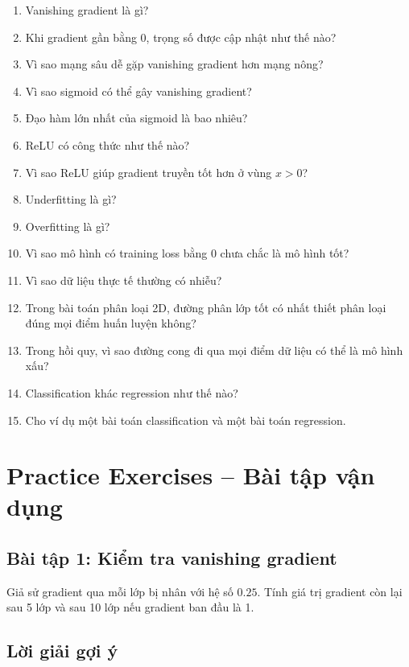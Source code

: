 \begin{enumerate}
    \item Vanishing gradient là gì?
    \item Khi gradient gần bằng 0, trọng số được cập nhật như thế nào?
    \item Vì sao mạng sâu dễ gặp vanishing gradient hơn mạng nông?
    \item Vì sao sigmoid có thể gây vanishing gradient?
    \item Đạo hàm lớn nhất của sigmoid là bao nhiêu?
    \item ReLU có công thức như thế nào?
    \item Vì sao ReLU giúp gradient truyền tốt hơn ở vùng $x>0$?
    \item Underfitting là gì?
    \item Overfitting là gì?
    \item Vì sao mô hình có training loss bằng 0 chưa chắc là mô hình tốt?
    \item Vì sao dữ liệu thực tế thường có nhiễu?
    \item Trong bài toán phân loại 2D, đường phân lớp tốt có nhất thiết phân loại đúng mọi điểm huấn luyện không?
    \item Trong hồi quy, vì sao đường cong đi qua mọi điểm dữ liệu có thể là mô hình xấu?
    \item Classification khác regression như thế nào?
    \item Cho ví dụ một bài toán classification và một bài toán regression.
\end{enumerate}

\section{Practice Exercises -- Bài tập vận dụng}

\subsection*{Bài tập 1: Kiểm tra vanishing gradient}

Giả sử gradient qua mỗi lớp bị nhân với hệ số $0.25$. Tính giá trị gradient còn lại sau 5 lớp và sau 10 lớp nếu gradient ban đầu là 1.

\subsection*{Lời giải gợi ý}

